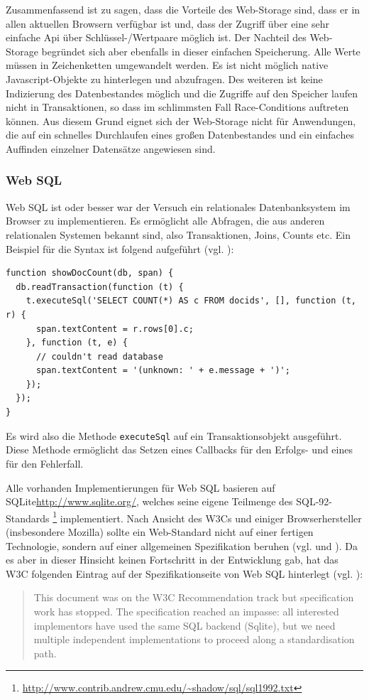 Zusammenfassend ist zu sagen, dass die Vorteile des Web-Storage sind, dass er in allen aktuellen Browsern verfügbar ist und, dass der Zugriff über eine sehr einfache Api über Schlüssel-/Wertpaare möglich ist. Der Nachteil des Web-Storage begründet sich aber ebenfalls in dieser einfachen Speicherung. Alle Werte müssen in Zeichenketten umgewandelt werden. Es ist nicht möglich native Javascript-Objekte zu hinterlegen und abzufragen. Des weiteren ist keine Indizierung des Datenbestandes möglich und die Zugriffe auf den Speicher laufen nicht in Transaktionen, so dass im schlimmsten Fall Race-Conditions auftreten können. Aus diesem Grund eignet sich der Web-Storage nicht für Anwendungen, die auf ein schnelles Durchlaufen eines großen Datenbestandes und ein einfaches Auffinden einzelner Datensätze angewiesen sind.

\subsubsection*{Web SQL}
Web SQL ist oder besser war der Versuch ein relationales Datenbanksystem im Browser zu implementieren. Es ermöglicht alle Abfragen, die aus anderen relationalen Systemen bekannt sind, also Transaktionen, Joins, Counts etc. Ein Beispiel für die Syntax ist folgend aufgeführt (vgl. \cite{W3C2010}):
\begin{lstlisting}
function showDocCount(db, span) {
  db.readTransaction(function (t) {
    t.executeSql('SELECT COUNT(*) AS c FROM docids', [], function (t, r) {
      span.textContent = r.rows[0].c;
    }, function (t, e) {
      // couldn't read database
      span.textContent = '(unknown: ' + e.message + ')';
    });
  });
}
\end{lstlisting}
Es wird also die Methode \texttt{executeSql} auf ein Transaktionsobjekt ausgeführt. Diese Methode ermöglicht das Setzen eines Callbacks für den Erfolgs- und eines für den Fehlerfall. 

Alle vorhanden Implementierungen für Web SQL basieren auf SQLite{\url{http://www.sqlite.org/}}, welches seine eigene Teilmenge des SQL-92-Standards \footnote{\url{http://www.contrib.andrew.cmu.edu/~shadow/sql/sql1992.txt}} implementiert. Nach Ansicht des W3Cs und einiger Browserhersteller (insbesondere Mozilla) sollte ein Web-Standard nicht auf einer fertigen Technologie, sondern auf einer allgemeinen Spezifikation beruhen (vgl. \cite{W3C2010} und \cite{Ranganathan2010}). Da es aber in dieser Hinsicht keinen Fortschritt in der Entwicklung gab, hat das W3C folgenden Eintrag auf der Spezifikationseite von Web SQL hinterlegt (vgl. \cite{W3C2010}):
\begin{quotation}
 This document was on the W3C Recommendation track but specification work has stopped. The specification reached an impasse: all interested implementors have used the same SQL backend (Sqlite), but we need multiple independent implementations to proceed along a standardisation path.
\end{quotation} 

